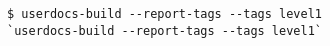\begin{verbatim}
$ userdocs-build --report-tags --tags level1
`userdocs-build --report-tags --tags level1`
\end{verbatim}
